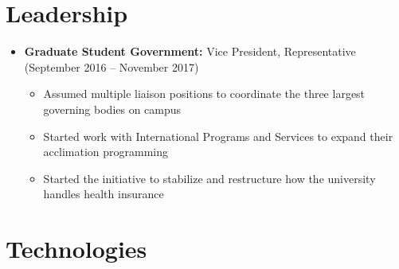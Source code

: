 \documentclass[10pt,a4paper,sans]{moderncv}        %
\begin{document}
\vspace{2pt}


\section{Leadership}

\vspace{6pt}

\begin{itemize}

\item \textbf{Graduate Student Government:} Vice President, Representative (September 2016 -- November 2017)
\begin{itemize}
	\item Assumed multiple liaison positions to coordinate the three largest governing bodies on campus
	\item Started work with International Programs and Services to expand their acclimation programming
	\item Started the initiative to stabilize and restructure how the university handles health insurance
\end{itemize}

\end{itemize}


\vspace{2pt}

%
%
%
%


\section{Technologies}
\end{document}
